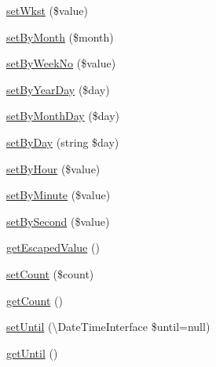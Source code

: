 \begin{DoxyCompactItemize}
\item 
\mbox{\hyperlink{class_eluceo_1_1i_cal_1_1_property_1_1_event_1_1_recurrence_rule_a135a880639390f1f0f7f7c82deef1fd7}{set\+Wkst}} (\$value)
\item 
\mbox{\hyperlink{class_eluceo_1_1i_cal_1_1_property_1_1_event_1_1_recurrence_rule_aa31c68d9cfd6355a0d8b2173ff2dedb5}{set\+By\+Month}} (\$month)
\item 
\mbox{\hyperlink{class_eluceo_1_1i_cal_1_1_property_1_1_event_1_1_recurrence_rule_a94c0f6b5f543a395e5edb45d2acf77c5}{set\+By\+Week\+No}} (\$value)
\item 
\mbox{\hyperlink{class_eluceo_1_1i_cal_1_1_property_1_1_event_1_1_recurrence_rule_a7e1f459a0be3139aa57b17e3f46d20dc}{set\+By\+Year\+Day}} (\$day)
\item 
\mbox{\hyperlink{class_eluceo_1_1i_cal_1_1_property_1_1_event_1_1_recurrence_rule_a51cb3376640302adb54a73919d863f70}{set\+By\+Month\+Day}} (\$day)
\item 
\mbox{\hyperlink{class_eluceo_1_1i_cal_1_1_property_1_1_event_1_1_recurrence_rule_abdbd6172cc8c72e3136d183d3009e78d}{set\+By\+Day}} (string \$day)
\item 
\mbox{\hyperlink{class_eluceo_1_1i_cal_1_1_property_1_1_event_1_1_recurrence_rule_ad07d01d74920458bd6fa49c0c256cf98}{set\+By\+Hour}} (\$value)
\item 
\mbox{\hyperlink{class_eluceo_1_1i_cal_1_1_property_1_1_event_1_1_recurrence_rule_a94cd2608d8ecb268f10610e20f4fcd4c}{set\+By\+Minute}} (\$value)
\item 
\mbox{\hyperlink{class_eluceo_1_1i_cal_1_1_property_1_1_event_1_1_recurrence_rule_a747c3236d673a8d18328402576c79fb6}{set\+By\+Second}} (\$value)
\item 
\mbox{\hyperlink{class_eluceo_1_1i_cal_1_1_property_1_1_event_1_1_recurrence_rule_aeefc9e0958f7fbd8fc54d622c6fec793}{get\+Escaped\+Value}} ()
\item 
\mbox{\hyperlink{class_eluceo_1_1i_cal_1_1_property_1_1_event_1_1_recurrence_rule_aac239d51ccec2021d01fc408ea33cbf7}{set\+Count}} (\$count)
\item 
\mbox{\hyperlink{class_eluceo_1_1i_cal_1_1_property_1_1_event_1_1_recurrence_rule_ab8421d5cfd85c4e340cc3964dbb9c1b6}{get\+Count}} ()
\item 
\mbox{\hyperlink{class_eluceo_1_1i_cal_1_1_property_1_1_event_1_1_recurrence_rule_a4734805877b1b97c7fd0be51e76652f5}{set\+Until}} (\textbackslash{}Date\+Time\+Interface \$until=null)
\item 
\mbox{\hyperlink{class_eluceo_1_1i_cal_1_1_property_1_1_event_1_1_recurrence_rule_a0f3229985d8494d4771a3f5576a42c1e}{get\+Until}} ()

\end{DoxyCompactItemize}
